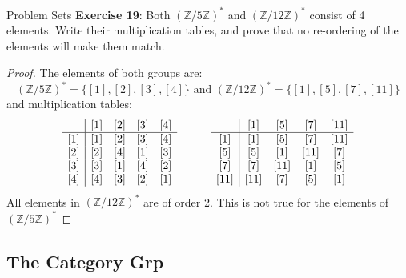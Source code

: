 \documentclass{report}
\begin{document}
\begin{exercises}{Problem Sets}
    \textbf{Exercise 19}: Both $(\mathbb{Z}/5\mathbb{Z})^{*}$ and $(\mathbb{Z}/12\mathbb{Z})^{*}$ consist of 4 elements. Write their multiplication tables, and prove that no re-ordering of the elements will make them match.
        \begin{proof}
            The elements of both groups are:
                \begin{equation*}
                    (\mathbb{Z}/5\mathbb{Z})^{*} = \{[1], [2], [3], [4]\} \text{ and } (\mathbb{Z}/12\mathbb{Z})^{*} = \{[1], [5], [7], [11]\}
                \end{equation*}
            and multiplication tables:
                \begin{align*}
                    \begin{array}{ c | c c c c }
                            & {[1]} & {[2]} & {[3]} & {[4]} \\
                    \hline
                        {[1]} & {[1]} & {[2]} & {[3]} & {[4]} \\
                        {[2]} & {[2]} & {[4]} & {[1]} & {[3]} \\
                        {[3]} & {[3]} & {[1]} & {[4]} & {[2]} \\
                        {[4]} & {[4]} & {[3]} & {[2]} & {[1]}   
                    \end{array}
                        \hspace{30pt} 
                    \begin{array}{ c | c c c c }
                             & {[1]}  & {[5]}  & {[7]}  & {[11]} \\
                    \hline
                        {[1]}  & {[1]}  & {[5]}  & {[7]}  & {[11]} \\
                        {[5]}  & {[5]}  & {[1]}  & {[11]} & {[7]}  \\
                        {[7]}  & {[7]}  & {[11]} & {[1]}  & {[5]}  \\
                        {[11]} & {[11]} & {[7]}  & {[5]}  & {[1]}   
                    \end{array}
                \end{align*}
            All elements in $(\mathbb{Z}/12\mathbb{Z})^{*}$ are of order 2. This is not true for the elements of $(\mathbb{Z}/5\mathbb{Z})^{*}$
        \end{proof}
\end{exercises}

\begin{topic}
    \section{The Category Grp}
\end{topic}
\end{document}
